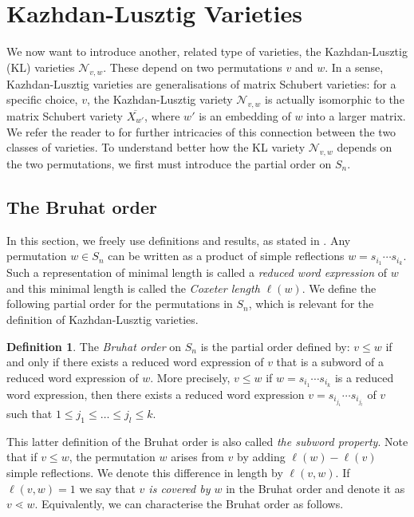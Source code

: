 \documentclass[11pt]{amsart}
\theoremstyle{definition}
\theoremstyle{definition}
\newtheorem{definition}[theorem]{Definition}
\theoremstyle{definition}
\theoremstyle{definition}
\newcommand{\Nvw}{\mathcal{N}_{v,w}}
\begin{document}
\section{Kazhdan-Lusztig Varieties}\label{sec: KL varieties}

\noindent We now want to introduce another, related type of varieties, the Kazhdan-Lusztig (KL) varieties $\Nvw$. These depend on two permutations $v$ and $w$. In a sense, Kazhdan-Lusztig varieties are generalisations of matrix Schubert varieties: for a specific choice, $v$, the Kazhdan-Lusztig variety $\Nvw$ is actually isomorphic to the matrix Schubert variety $\overline{X_{w'}}$, where $w'$ is an embedding of $w$ into a larger matrix. We refer the reader to \cite{donten2021complexity} for further intricacies of this connection between the two classes of varieties. To understand better how the KL variety $\Nvw$ depends on the two permutations, we first must introduce the partial order on $S_n$. 
 
\subsection{The Bruhat order}\label{subsec: Bruhat order}

\noindent In this section, we freely use definitions and results, as stated in  \cite{bjorner2005combinatorics}.
Any permutation $w\in S_n$ can be written as a product of simple reflections $w= s_{i_1} \cdots s_{i_k}$.
Such a representation of minimal length is called a \emph{reduced word expression} of $w$ and this minimal length is called the \emph{Coxeter length} $\ell(w)$.
We define the following partial order for the permutations in $S_n$, which is relevant for the definition of Kazhdan-Lusztig varieties.



\begin{definition}
    The \emph{Bruhat order} on $S_n$ is the partial order defined by: $v \leq w$ if and only if there exists a reduced word expression of $v$ that is a subword of a reduced word expression of $w$. More precisely, $v \leq w$ if $w= s_{i_1} \cdots s_{i_k}$ is a reduced word expression, then there exists a reduced word expression $v=s_{i_{j_1}} \cdots s_{i_{j_l}}$ of $v$ such that $1 \leq j_1 \leq \ldots \leq j_l \leq k$.
\end{definition}

\noindent This latter definition of the Bruhat order is also called \textit{the subword property}.
Note that if $v\leq w$, the permutation $w$ arises from $v$ by adding $\ell(w)-\ell(v)$ simple reflections. We denote this difference in length by $\ell(v,w)$. If $\ell(v,w)=1$ we say that \emph{$v$ is covered by $w$} in the Bruhat order and denote it as $v \lessdot w$. Equivalently, we can characterise the Bruhat order as follows.
\end{document}
